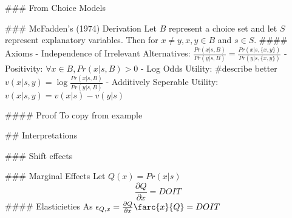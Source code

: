 \documentclass{article}
\begin{document}
### From Choice Models


### McFadden's (1974) Derivation
Let $B$ represent a choice set and let $S$ represent explanatory variables.
Then for $ x \neq y, {x,y} \in B$ and $s \in S$.
#### Axioms
 - Independence of Irrelevant Alternatives: $\frac{Pr(x|s,B)}{Pr(y|s,B)} = \frac{Pr(x|s,\{x,y\})}{Pr(y|s,\{x,y\})}$
 - Positivity: $\forall x\in B, Pr(x|s,B) > 0$
 - Log Odds Utility: #describe better $v(x|s,y) = \log \frac{Pr(x|s,B)}{Pr(y|s,B)}$
 - Additively Seperable Utility: $v(x|s,y) = v(x|s) - v(y|s)$

#### Proof
To copy from example

## Interpretations

### Shift effects

### Marginal Effects
Let $Q(x) = Pr(x|s)$
$$
\frac{\partial Q}{\partial x} = DO IT
$$
#### Elasticieties
As $\epsilon_{Q,x} = \frac{\partial Q}{\partial x} \farc{x}{Q} = DO IT$
\end{document}
